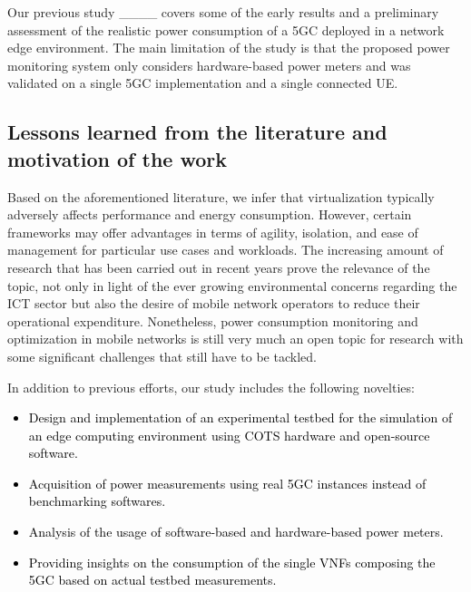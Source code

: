 Our previous study ____ covers some of the early results and a preliminary assessment of the realistic power consumption of a 5GC deployed in a network edge environment. The main limitation of the study is that the proposed power monitoring system only considers hardware-based power meters and was validated on a single 5GC implementation and a single connected UE.

\subsection{Lessons learned from the literature and motivation of the work}
\label{subsec:Motivation}

Based on the aforementioned literature, we infer that virtualization typically adversely affects performance and energy consumption. However, certain frameworks may offer advantages in terms of agility, isolation, and ease of management for particular use cases and workloads.
The increasing amount of research that has been carried out in recent years prove the relevance of the topic, not only in light of the ever growing environmental concerns regarding the ICT sector but also the desire of mobile network operators to reduce their operational expenditure.
Nonetheless, power consumption monitoring and optimization in mobile networks is still very much an open topic for research with some significant challenges that still have to be tackled.

In addition to previous efforts, our study includes the following novelties:
\textcolor{black}{
\begin{itemize}
    \item Design and implementation of an experimental testbed for the simulation of an edge computing environment using COTS hardware and open-source software.
    \item Acquisition of power measurements using real 5GC instances instead of benchmarking softwares.
    \item Analysis of the usage of software-based and hardware-based power meters.
    \item Providing insights on the consumption of the single VNFs composing the 5GC based on actual testbed measurements.
\end{itemize}
}